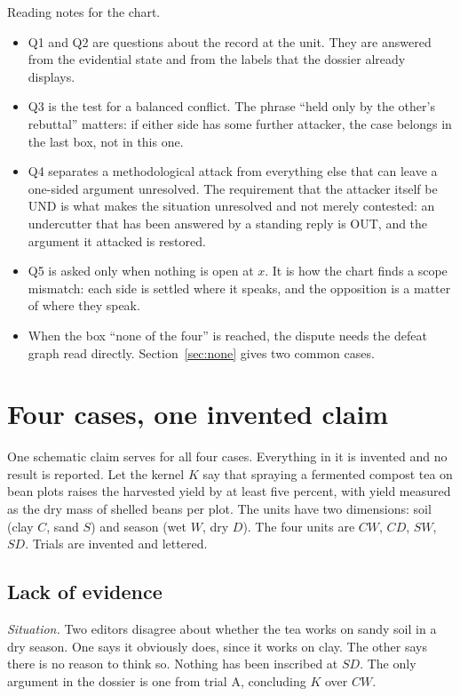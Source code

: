 \documentclass[11pt]{article}
\newcommand{\UND}{\textsf{UND}}
\newcommand{\OUT}{\textsf{OUT}}
\begin{document}
Reading notes for the chart.

\begin{itemize}[nosep]
\item Q1 and Q2 are questions about the record at the unit. They are answered from the evidential state and from the labels that the dossier already displays.
\item Q3 is the test for a balanced conflict. The phrase ``held only by the other's rebuttal'' matters: if either side has some further attacker, the case belongs in the last box, not in this one.
\item Q4 separates a methodological attack from everything else that can leave a one-sided argument unresolved. The requirement that the attacker itself be \UND{} is what makes the situation unresolved and not merely contested: an undercutter that has been answered by a standing reply is \OUT{}, and the argument it attacked is restored.
\item Q5 is asked only when nothing is open at $x$. It is how the chart finds a scope mismatch: each side is settled where it speaks, and the opposition is a matter of where they speak.
\item When the box ``none of the four'' is reached, the dispute needs the defeat graph read directly. Section~\ref{sec:none} gives two common cases.
\end{itemize}

\section{Four cases, one invented claim}\label{sec:cases}

One schematic claim serves for all four cases. Everything in it is invented and no result is reported. Let the kernel $K$ say that spraying a fermented compost tea on bean plots raises the harvested yield by at least five percent, with yield measured as the dry mass of shelled beans per plot. The units have two dimensions: soil (clay $C$, sand $S$) and season (wet $W$, dry $D$). The four units are $CW$, $CD$, $SW$, $SD$. Trials are invented and lettered.

\subsection{Lack of evidence}

\emph{Situation.} Two editors disagree about whether the tea works on sandy soil in a dry season. One says it obviously does, since it works on clay. The other says there is no reason to think so. Nothing has been inscribed at $SD$. The only argument in the dossier is one from trial A, concluding $K$ over $CW$.
\end{document}
